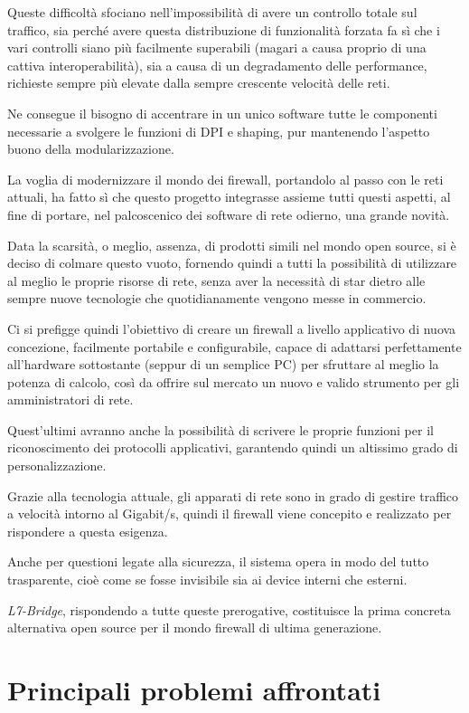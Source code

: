 Queste difficoltà sfociano nell'impossibilità di avere un controllo totale sul traffico, sia perché avere questa distribuzione di funzionalità forzata fa sì che i vari controlli siano più facilmente superabili (magari a causa proprio di una cattiva interoperabilità), sia a causa di un degradamento delle performance, richieste sempre più elevate dalla sempre crescente velocità delle reti.

Ne consegue il bisogno di accentrare in un unico software tutte le componenti necessarie a svolgere le funzioni di DPI e shaping, pur mantenendo l'aspetto buono della modularizzazione.

La voglia di modernizzare il mondo dei firewall, portandolo al passo con le reti attuali, ha fatto sì che questo progetto integrasse assieme tutti questi aspetti, al fine di portare, nel palcoscenico dei software di rete odierno, una grande novità.

Data la scarsità, o meglio, assenza, di prodotti simili nel mondo open source, si è deciso di colmare questo vuoto, fornendo quindi a tutti la possibilità di utilizzare al meglio le proprie risorse di rete, senza aver la necessità di star dietro alle sempre nuove tecnologie che quotidianamente vengono messe in commercio.

Ci si prefigge quindi l'obiettivo di creare un firewall a livello applicativo di nuova concezione, facilmente portabile e configurabile, capace di adattarsi perfettamente all'hardware sottostante (seppur di un semplice PC) per sfruttare al meglio la potenza di calcolo, così da offrire sul mercato un nuovo e valido strumento per gli amministratori di rete.

Quest'ultimi avranno anche la possibilità di scrivere le proprie funzioni per il riconoscimento dei protocolli applicativi, garantendo quindi un altissimo grado di personalizzazione.

Grazie alla tecnologia attuale, gli apparati di rete sono in grado di gestire traffico a velocità intorno al Gigabit/s, quindi il firewall viene concepito e realizzato per rispondere a questa esigenza.

Anche per questioni legate alla sicurezza, il sistema opera in modo del tutto trasparente, cioè come se fosse invisibile sia ai device interni che esterni.

\emph{L7-Bridge}, rispondendo a tutte queste prerogative, costituisce la prima concreta alternativa open source per il mondo firewall di ultima generazione.

\section{Principali problemi affrontati}

